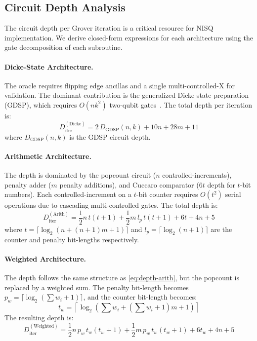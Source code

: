 \documentclass{ieeeaccess}
\begin{document}
\subsection{Circuit Depth Analysis}
\label{sec:depth_analysis}

The circuit depth per Grover iteration is a critical resource
for NISQ implementation. We derive closed-form expressions
for each architecture using the gate decomposition of each
subroutine.

\paragraph{Dicke-State Architecture.}
The oracle requires flipping edge ancillas and a single
multi-controlled-X for validation. The dominant contribution
is the generalized Dicke state preparation (GDSP), which
requires $O(nk^2)$ two-qubit gates~\cite{narisada_concrete_2023}.
The total depth per iteration is:
\begin{equation}
    D_{\mathrm{iter}}^{\mathrm{(Dicke)}}
    = 2\,D_{\mathrm{GDSP}}(n,k) + 10n + 28m + 11
    \label{eq:depth-dicke}
\end{equation}
where $D_{\mathrm{GDSP}}(n,k)$ is the GDSP circuit depth.

\paragraph{Arithmetic Architecture.}
The depth is dominated by the popcount circuit ($n$
controlled-increments), penalty adder ($m$ penalty
additions), and Cuccaro comparator ($6t$ depth for
$t$-bit numbers). Each controlled-increment on a
$t$-bit counter requires $O(t^2)$ serial operations
due to cascading multi-controlled gates. The total
depth is:
\begin{equation}
    D_{\mathrm{iter}}^{\mathrm{(Arith)}}
    = \frac{1}{2}n\,t(t+1)
    + \frac{1}{2}m\,l_p\,t(t+1)
    + 6t + 4n + 5
    \label{eq:depth-arith}
\end{equation}
where $t = \lceil\log_2(n + (n+1)m + 1)\rceil$ and
$l_p = \lceil\log_2(n+1)\rceil$ are the counter and
penalty bit-lengths respectively.

\paragraph{Weighted Architecture.}
The depth follows the same structure as
\eqref{eq:depth-arith}, but the popcount is replaced
by a weighted sum. The penalty bit-length becomes
$p_w = \lceil\log_2(\sum w_i + 1)\rceil$, and the
counter bit-length becomes:
\begin{equation}
    t_w = \left\lceil\log_2\!\left(
        \textstyle\sum w_i
        + (\textstyle\sum w_i + 1)m + 1
      \right)\right\rceil
    \label{eq:tw-def}
\end{equation}
The resulting depth is:
\begin{equation}
    D_{\mathrm{iter}}^{\mathrm{(Weighted)}}
    = \frac{1}{2}n\,p_w\,t_w(t_w+1)
    + \frac{1}{2}m\,p_w\,t_w(t_w+1)
    + 6t_w + 4n + 5
    \label{eq:depth-weighted}
\end{equation}
\end{document}
